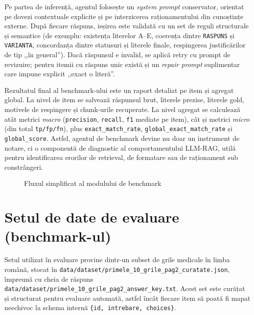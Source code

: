 \documentclass[12pt, a4paper, oneside, romanian]{teza-upb}
\begin{document}
Pe partea de inferență, agentul folosește un \textit{system prompt} conservator, orientat pe dovezi contextuale explicite și pe interzicerea raționamentului din cunoștințe externe. După fiecare răspuns, ieșirea este validată cu un set de reguli structurale și semantice (de exemplu: existența literelor A--E, coerența dintre \texttt{RASPUNS} și \texttt{VARIANTA}, concordanța dintre statusuri și literele finale, respingerea justificărilor de tip ,,în general''). Dacă răspunsul e invalid, se aplică retry cu prompt de revizuire; pentru itemii cu răspuns unic există și un \textit{repair prompt} suplimentar care impune explicit ,,exact o literă''.

Rezultatul final al benchmark-ului este un raport detaliat pe item și agregat global. La nivel de item se salvează răspunsul brut, literele prezise, literele gold, motivele de respingere și chunk-urile recuperate. La nivel agregat se calculează atât metrici \textit{macro} (\texttt{precision}, \texttt{recall}, \texttt{f1} mediate pe item), cât și metrici \textit{micro} (din total \texttt{tp/fp/fn}), plus \texttt{exact\_match\_rate}, \texttt{global\_exact\_match\_rate} și \texttt{global\_score}. Astfel, agentul de benchmark devine nu doar un instrument de notare, ci o componentă de diagnostic al comportamentului LLM-RAG, utilă pentru identificarea erorilor de retrieval, de formatare sau de raționament sub constrângeri.

\begin{figure}[H]
\centering
{}
\caption{Fluxul simplificat al modulului de benchmark}
\label{fig:benchmark-flow}
\end{figure}

\section{Setul de date de evaluare (benchmark-ul)}

Setul utilizat în evaluare provine dintr-un subset de grile medicale în limba română, stocat în \texttt{data/dataset/primele\_10\_grile\_pag2\_curatate.json}, împreună cu cheia de răspuns \texttt{data/dataset/primele\_10\_grile\_pag2\_answer\_key.txt}. Acest set este curățat și structurat pentru evaluare automată, astfel încât fiecare item să poată fi mapat neechivoc la schema internă \texttt{\{id, intrebare, choices\}}.
\end{document}
